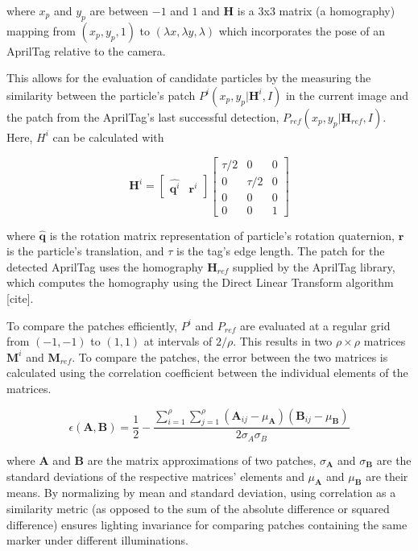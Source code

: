 \documentclass[letterpaper, 10 pt, conference]{ieeeconf}
\renewcommand{\vec}[1]{\boldsymbol{#1}}
\begin{document}
where $x_p$ and $y_p$ are between $-1$ and $1$ and $\vec{H}$ is a 3x3 matrix (a homography) mapping from $(x_p, y_p, 1)$ to $(\lambda x, \lambda y, \lambda)$ which incorporates the pose of an AprilTag relative to the camera. 


This allows for the evaluation of candidate particles by the measuring the similarity between the particle's patch $P^i(x_p,y_p|\vec{H}^i,I)$ in the current image and the patch from the AprilTag's last successful detection, $P_{ref}(x_p,y_p|\vec{H}_{ref},I)$. Here, $H^i$ can be calculated with

\begin{equation} \label{eq:particle_homography}
\vec{H}^i = \begin{bmatrix}
		\widehat{\vec{q}^i} & \vec{r}^i
	\end{bmatrix} \begin{bmatrix}
		\tau/2 & 0 & 0 \\
		0 & \tau/2 & 0 \\
		0 & 0 & 0 \\
		0 & 0 & 1
	\end{bmatrix}
\end{equation}



where $\widehat{\vec{q}}$ is the rotation matrix representation of particle's rotation quaternion, $\vec{r}$ is the particle's translation, and $\tau$ is the tag's edge length. The patch for the detected AprilTag uses the homography $\vec{H}_{ref}$ supplied by the AprilTag library, which computes the homography using the Direct Linear Transform algorithm [cite]. 


To compare the patches efficiently, $P^i$ and $P_{ref}$ are evaluated at a regular grid from $(-1, -1)$ to $(1, 1)$ at intervals of $2 / \rho$. This results in two $\rho \times \rho$ matrices $\vec{M}^i$ and $\vec{M}_{ref}$. To compare the patches, the error between the two  matrices is calculated using the correlation coefficient between the individual elements of the matrices.

\begin{equation}
	\epsilon(\vec{A}, \vec{B}) = \frac{1}{2} - \frac{\sum_{i=1}^{\rho} \sum_{j=1}^{\rho} (\vec{A}_{ij} - \mu_{\vec{A}})(\vec{B}_{ij} - \mu_{\vec{B}}) }{2\sigma_{A} \sigma_{B}}
\end{equation}

where $\vec{A}$ and $\vec{B}$ are the matrix approximations of two patches, $\sigma_{\vec{A}}$ and $\sigma_{\vec{B}}$ are the standard deviations of the respective matrices' elements and $\mu_{\vec{A}}$ and $\mu_{\vec{B}}$ are their means. By normalizing by mean and standard deviation, using correlation as a similarity metric (as opposed to the sum of the absolute difference or squared difference) ensures lighting invariance for comparing patches containing the same marker under different illuminations.
\end{document}
